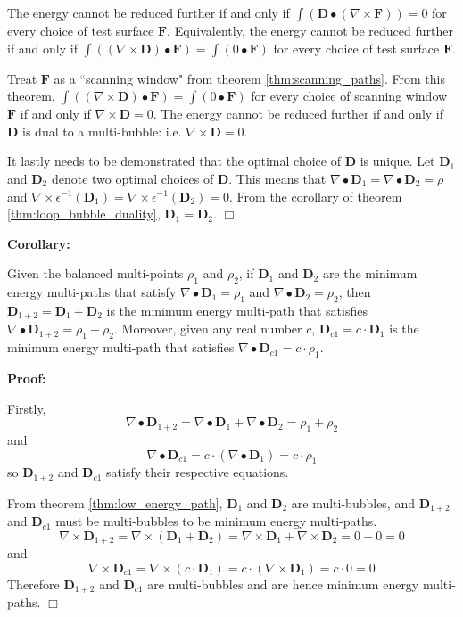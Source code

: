 The energy cannot be reduced further if and only if \(\int (\mathbf{D} \bullet (\nabla \times \mathbf{F})) = 0\) for every choice of test surface \(\mathbf{F}\). Equivalently, the energy cannot be reduced further if and only if \(\int ((\nabla \times \mathbf{D}) \bullet \mathbf{F}) = \int (0 \bullet \mathbf{F})\) for every choice of test surface \(\mathbf{F}\).

Treat \(\mathbf{F}\) as a ``scanning window" from theorem \ref{thm:scanning_paths}. From this theorem, \(\int ((\nabla \times \mathbf{D}) \bullet \mathbf{F}) = \int (0 \bullet \mathbf{F})\) for every choice of scanning window \(\mathbf{F}\) if and only if \(\nabla \times \mathbf{D} = 0\). The energy cannot be reduced further if and only if \(\mathbf{D}\) is dual to a multi-bubble: i.e. \(\nabla \times \mathbf{D} = 0\).

It lastly needs to be demonstrated that the optimal choice of \(\mathbf{D}\) is unique. Let \(\mathbf{D}_1\) and \(\mathbf{D}_2\) denote two optimal choices of \(\mathbf{D}\). This means that \(\nabla \bullet \mathbf{D}_1 = \nabla \bullet \mathbf{D}_2 = \rho\) and \(\nabla \times \epsilon^{-1}(\mathbf{D}_1) = \nabla \times \epsilon^{-1}(\mathbf{D}_2) = 0\). From the corollary of theorem \ref{thm:loop_bubble_duality}, \(\mathbf{D}_1 = \mathbf{D}_2\). \(\Box\) 

\textbf{Corollary:}

Given the balanced multi-points \(\rho_1\) and \(\rho_2\), if \(\mathbf{D}_1\) and \(\mathbf{D}_2\) are the minimum energy multi-paths that satisfy \(\nabla \bullet \mathbf{D}_1 = \rho_1\) and \(\nabla \bullet \mathbf{D}_2 = \rho_2\), then \(\mathbf{D}_{1+2} = \mathbf{D}_1 + \mathbf{D}_2\) is the minimum energy multi-path that satisfies \(\nabla \bullet \mathbf{D}_{1+2} = \rho_1 + \rho_2\). Moreover, given any real number \(c\), \(\mathbf{D}_{c1} = c \cdot \mathbf{D}_1\) is the minimum energy multi-path that satisfies \(\nabla \bullet \mathbf{D}_{c1} = c \cdot \rho_1\).

\textbf{Proof:}

Firstly, 
\[\nabla \bullet \mathbf{D}_{1+2} = \nabla \bullet \mathbf{D}_1 + \nabla \bullet \mathbf{D}_2 = \rho_1 + \rho_2\]
and 
\[\nabla \bullet \mathbf{D}_{c1} = c \cdot (\nabla \bullet \mathbf{D}_1) = c \cdot \rho_1\]
so \(\mathbf{D}_{1+2}\) and \(\mathbf{D}_{c1}\) satisfy their respective equations.

From theorem \ref{thm:low_energy_path}, \(\mathbf{D}_1\) and \(\mathbf{D}_2\) are multi-bubbles, and \(\mathbf{D}_{1+2}\) and \(\mathbf{D}_{c1}\) must be multi-bubbles to be minimum energy multi-paths. 
\[\nabla \times \mathbf{D}_{1+2} = \nabla \times (\mathbf{D}_1 + \mathbf{D}_2) = \nabla \times \mathbf{D}_1 + \nabla \times \mathbf{D}_2 = 0 + 0 = 0\]
and 
\[\nabla \times \mathbf{D}_{c1} = \nabla \times (c \cdot \mathbf{D}_1) = c \cdot (\nabla \times \mathbf{D}_1) = c \cdot 0 = 0\]
Therefore \(\mathbf{D}_{1+2}\) and \(\mathbf{D}_{c1}\) are multi-bubbles and are hence minimum energy multi-paths. \(\Box\)

